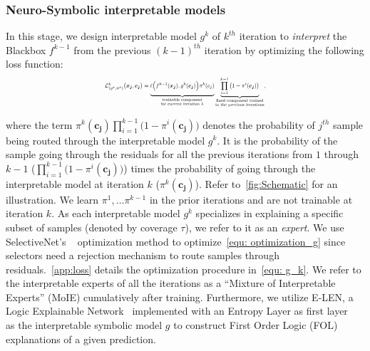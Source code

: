 \subsubsection{Neuro-Symbolic interpretable models}
\label{ns-optimization}
In this stage, we design interpretable model $\displaystyle g^k$ of $k^{th}$ iteration  to \emph{interpret} the Blackbox $\displaystyle f^{k - 1}$ from the previous $(k-1)^{th}$ iteration by optimizing the following loss function:
\begin{equation}
\label{equ: g_k}
\resizebox{0.47\textwidth}{!}{$
\mathcal{L}_{(g^k, \pi^k)}^k\big(\boldsymbol{x_j}, \boldsymbol{c_j}\big) = \underbrace{\mystrut{2.6ex}\ell\Big(f^{k - 1}(\boldsymbol{x_j}), g^k(\boldsymbol{c_j})\Big)\pi^k(c_j) }_{\substack{\text{trainable component} \\ \text{for current iteration $k$}}}\underbrace{\prod_{i=1} ^{k - 1}\big(1 - \pi^i(\boldsymbol{c_j})\big)}_{\substack{\text{fixed component trained} \\ \text{in the previous iterations}}},
$}
\end{equation}

where the term $\pi^k(\boldsymbol{c_j})\prod_{i=1} ^{k - 1}\big(1 - \pi^i(\boldsymbol{c_j}) \big)$ denotes the probability of $j^{th}$ sample being routed through the interpretable model $g^k$. It is the probability of the sample going through the residuals for all the previous iterations from $1$ through $k-1$ (\ie $\prod_{i=1} ^{k - 1}\big(1 - \pi^i(\boldsymbol{c_j}) \big)$\big) times the probability of going through the interpretable model at iteration $k$ \big(\ie $\pi^k(\boldsymbol{c_j})$\big). 
Refer to~\cref{fig:Schematic} for an illustration. We learn $\pi^1, \dots \pi^{k - 1}$ in the prior iterations and are not trainable at iteration $k$. As each interpretable model $g^k$ specializes in explaining a specific subset of samples (denoted by coverage $\tau$), we refer to it as an \emph{expert}. We use SelectiveNet's ~\cite{geifman2019selectivenet}  optimization method to optimize~\cref{equ: optimization_g} since selectors need a rejection mechanism to route samples through residuals.~\cref{app:loss} details the optimization procedure in~\cref{equ: g_k}. We refer to the interpretable experts of all the iterations as a ``Mixture of Interpretable Experts'' (MoIE) cumulatively after training. Furthermore, we utilize E-LEN, \ie a Logic Explainable Network~\cite{ciravegna2023logic} implemented with an Entropy Layer as first layer~\cite{barbiero2022entropy} as the interpretable symbolic model $g$ to construct First Order Logic (FOL) explanations of a given prediction.

